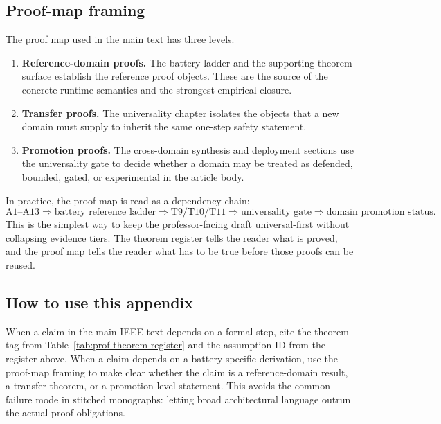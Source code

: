 

\subsection{Proof-map framing}
The proof map used in the main text has three levels.
\begin{enumerate}
  \item \textbf{Reference-domain proofs.}  The battery ladder and the supporting
  theorem surface establish the reference proof objects.  These are the source of the
  concrete runtime semantics and the strongest empirical closure.
  \item \textbf{Transfer proofs.}  The universality chapter isolates the objects that a
  new domain must supply to inherit the same one-step safety statement.
  \item \textbf{Promotion proofs.}  The cross-domain synthesis and deployment sections
  use the universality gate to decide whether a domain may be treated as defended,
  bounded, gated, or experimental in the article body.
\end{enumerate}

In practice, the proof map is read as a dependency chain:
\[
  \text{A1--A13} \Longrightarrow
  \text{battery reference ladder} \Longrightarrow
  \text{T9/T10/T11} \Longrightarrow
  \text{universality gate} \Longrightarrow
  \text{domain promotion status}.
\]
This is the simplest way to keep the professor-facing draft universal-first without
collapsing evidence tiers.  The theorem register tells the reader what is proved, and the
proof map tells the reader what has to be true before those proofs can be reused.

\subsection{How to use this appendix}
When a claim in the main IEEE text depends on a formal step, cite the theorem tag from
Table~\ref{tab:prof-theorem-register} and the assumption ID from the register above.
When a claim depends on a battery-specific derivation, use the proof-map framing to make
clear whether the claim is a reference-domain result, a transfer theorem, or a
promotion-level statement.  This avoids the common failure mode in stitched monographs:
letting broad architectural language outrun the actual proof obligations.
